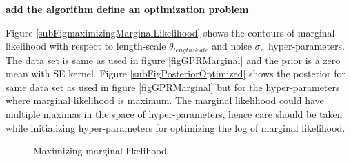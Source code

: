 \begin{mdframed}[hidealllines=true,backgroundcolor=lightgray!20]
\textbf{add the algorithm}
\textbf{define an optimization problem}

Figure \ref{subFigmaximizingMarginalLikelihood} shows the contours of marginal likelihood with respect to length-scale $\theta_{lengthScale}$ and noise $\sigma_{n}$ hyper-parameters. The data set is same as used in figure \ref{figGPRMarginal} and the prior is a zero mean with SE kernel. Figure \ref{subFigPosteriorOptimized} shows the posterior for same data set as used in figure \ref{figGPRMarginal} but for the hyper-parameters where marginal likelihood is maximum. The marginal likelihood could have multiple maximas in the space of hyper-parameters, hence care should be taken while initializing hyper-parameters for optimizing the log of marginal likelihood. 

\end{mdframed}
  \begin{figure}[!ht]
  \centering
    \quad
  \quad
       \caption{Maximizing marginal likelihood}\label{figGPRMarginalOptimized}
\end{figure}

